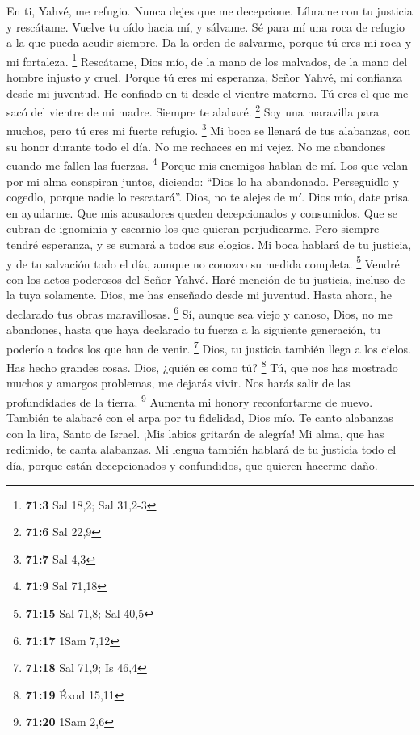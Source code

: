 \begin{paracol}{2}
 En ti, Yahvé, me refugio. Nunca dejes que me decepcione.
 Líbrame con tu justicia y rescátame. Vuelve tu oído hacia
mí, y sálvame.  Sé para mí una roca de refugio a la que
pueda acudir siempre. Da la orden de salvarme, porque tú eres mi roca y
mi fortaleza. \footnote{\textbf{71:3} Sal 18,2; Sal 31,2-3}
 Rescátame, Dios mío, de la mano de los malvados, de la
mano del hombre injusto y cruel.  Porque tú eres mi
esperanza, Señor Yahvé, mi confianza desde mi juventud. 
He confiado en ti desde el vientre materno. Tú eres el que me sacó del
vientre de mi madre. Siempre te alabaré. \footnote{\textbf{71:6} Sal
  22,9}  Soy una maravilla para muchos, pero tú eres mi
fuerte refugio. \footnote{\textbf{71:7} Sal 4,3}  Mi boca
se llenará de tus alabanzas, con su honor durante todo el día.
 No me rechaces en mi vejez. No me abandones cuando me
fallen las fuerzas. \footnote{\textbf{71:9} Sal 71,18} 
Porque mis enemigos hablan de mí. Los que velan por mi alma conspiran
juntos,  diciendo: ``Dios lo ha abandonado. Perseguidlo y
cogedlo, porque nadie lo rescatará''.  Dios, no te alejes
de mí. Dios mío, date prisa en ayudarme.  Que mis
acusadores queden decepcionados y consumidos. Que se cubran de ignominia
y escarnio los que quieran perjudicarme.  Pero siempre
tendré esperanza, y se sumará a todos sus elogios.  Mi
boca hablará de tu justicia, y de tu salvación todo el día, aunque no
conozco su medida completa. \footnote{\textbf{71:15} Sal 71,8; Sal 40,5}
 Vendré con los actos poderosos del Señor Yahvé. Haré
mención de tu justicia, incluso de la tuya solamente. 
Dios, me has enseñado desde mi juventud. Hasta ahora, he declarado tus
obras maravillosas. \footnote{\textbf{71:17} 1Sam 7,12} 
Sí, aunque sea viejo y canoso, Dios, no me abandones, hasta que haya
declarado tu fuerza a la siguiente generación, tu poderío a todos los
que han de venir. \footnote{\textbf{71:18} Sal 71,9; Is 46,4}
 Dios, tu justicia también llega a los cielos. Has hecho
grandes cosas. Dios, ¿quién es como tú? \footnote{\textbf{71:19} Éxod
  15,11}  Tú, que nos has mostrado muchos y amargos
problemas, me dejarás vivir. Nos harás salir de las profundidades de la
tierra. \footnote{\textbf{71:20} 1Sam 2,6}  Aumenta mi
honory reconfortarme de nuevo.  También te alabaré con el
arpa por tu fidelidad, Dios mío. Te canto alabanzas con la lira, Santo
de Israel.  ¡Mis labios gritarán de alegría! Mi alma, que
has redimido, te canta alabanzas.  Mi lengua también
hablará de tu justicia todo el día, porque están decepcionados y
confundidos, que quieren hacerme daño.


\end{paracol}
